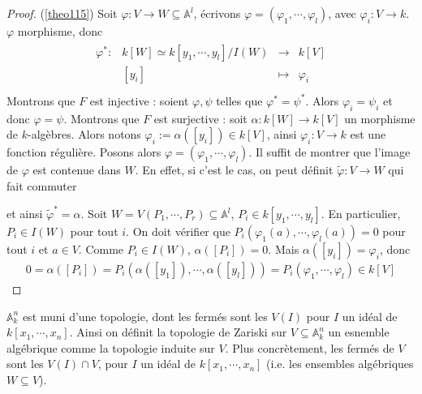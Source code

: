         \begin{proof} (\ref{theo115})
            Soit $\varphi : V \to W \subseteq \mathbb{A}^l$, écrivons $\varphi = (\varphi_1, \cdots, \varphi_l)$, avec $\varphi_i : V \to k$. $\varphi$ morphisme, donc
            \begin{align*}
                \begin{array}{cccc}
                    \varphi^* : & k[W] \simeq k[y_1, \cdots, y_l]/I(W) & \to & k[V] \\
                    & [y_i] & \mapsto & \varphi_i \\
                \end{array}
            \end{align*}
            Montrons que $F$ est injective : soient $\varphi, \psi$ telles que $\varphi^* = \psi^*$. Alors $\varphi_i = \psi_i$ et donc $\varphi = \psi$. Montrons que $F$ est surjective : soit $\alpha : k[W] \to k[V]$ un morphisme de $k$-algèbres. Alors notons $\varphi_i := \alpha([y_i]) \in k[V]$, ainsi $\varphi_i : V \to k$ est une fonction régulière. Posons alors $\varphi = (\varphi_1, \cdots, \varphi_l)$. Il suffit de montrer que l'image de $\varphi$ est contenue dans $W$. En effet, si c'est le cas, on peut définit $\tilde \varphi : V \to W$ qui fait commuter
            \begin{figure}[H]
                \centering
            \end{figure} \noindent
            et ainsi $\tilde \varphi ^* = \alpha$. Soit $W = V(P_1, \cdots, P_r) \subseteq \mathbb{A}^l$, $P_i \in k[y_1, \cdots, y_l]$. En particulier, $P_i \in I(W)$ pour tout $i$. On doit vérifier que $P_i(\varphi_1(a), \cdots, \varphi_l(a)) = 0$ pour tout $i$ et $a \in V$. Comme $P_i \in I(W)$, $\alpha([P_i]) = 0$. Mais $\alpha([y_i]) = \varphi_i$, donc 
            \begin{align*}
                0 = \alpha([P_i]) = P_i(\alpha([y_1]), \cdots, \alpha([y_l])) = P_i(\varphi_1, \cdots, \varphi_l) \in k[V]
            \end{align*}
        \end{proof}
        $\mathbb{A}_k^n$ est muni d'une topologie, dont les fermés sont les $V(I)$ pour $I$ un idéal de $k[x_1, \cdots, x_n]$. Ainsi on définit la topologie de Zariski sur $V \subseteq \mathbb{A}_k^n$ un esnemble algébrique comme la topologie induite sur $V$. Plus concrètement, les fermés de $V$ sont les $V(I) \cap V$, pour $I$ un idéal de $k[x_1, \cdots, x_n]$ (i.e. les ensembles algébriques $W \subseteq V$).
